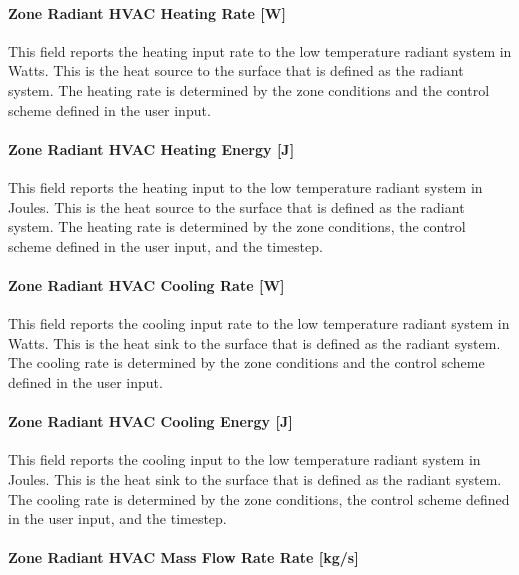 \paragraph{Zone Radiant HVAC Heating Rate {[}W{]}}\label{zone-radiant-hvac-heating-rate-w}

This field reports the heating input rate to the low temperature radiant system in Watts. This is the heat source to the surface that is defined as the radiant system. The heating rate is determined by the zone conditions and the control scheme defined in the user input.

\paragraph{Zone Radiant HVAC Heating Energy {[}J{]}}\label{zone-radiant-hvac-heating-energy-j}

This field reports the heating input to the low temperature radiant system in Joules. This is the heat source to the surface that is defined as the radiant system. The heating rate is determined by the zone conditions, the control scheme defined in the user input, and the timestep.

\paragraph{Zone Radiant HVAC Cooling Rate {[}W{]}}\label{zone-radiant-hvac-cooling-rate-w}

This field reports the cooling input rate to the low temperature radiant system in Watts. This is the heat sink to the surface that is defined as the radiant system. The cooling rate is determined by the zone conditions and the control scheme defined in the user input.

\paragraph{Zone Radiant HVAC Cooling Energy {[}J{]}}\label{zone-radiant-hvac-cooling-energy-j}

This field reports the cooling input to the low temperature radiant system in Joules. This is the heat sink to the surface that is defined as the radiant system. The cooling rate is determined by the zone conditions, the control scheme defined in the user input, and the timestep.

\paragraph{Zone Radiant HVAC Mass Flow Rate Rate {[}kg/s{]}}\label{zone-radiant-hvac-mass-flow-rate-rate-kgs}

